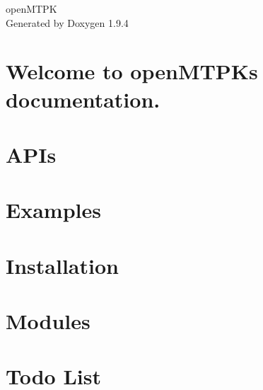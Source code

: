 \documentclass[twoside]{book}
\newcommand{\+}{\discretionary{\mbox{\scriptsize$\hookleftarrow$}}{}{}}
\newcommand{\clearemptydoublepage}{%
    \newpage{\pagestyle{empty}\cleardoublepage}%
  }
\begin{document}
  \raggedbottom
    \hypersetup{pageanchor=false,
                bookmarksnumbered=true,
                pdfencoding=unicode
               }
  \begin{titlepage}
  \vspace*{7cm}
  \begin{center}%
  {\Large open\+MTPK}\\
  \vspace*{1cm}
  {\large Generated by Doxygen 1.9.4}\\
  \end{center}
  \end{titlepage}
  \clearemptydoublepage
  \tableofcontents
  \clearemptydoublepage
  \hypersetup{pageanchor=true}
\chapter{Welcome to open\+MTPK\textquotesingle{}s documentation.}
\label{index}\hypertarget{index}{}
\chapter{APIs}
\label{md_docs_source_APIs}

\chapter{Examples}
\label{md_docs_source_Examples}

\chapter{Installation}
\label{md_docs_source_Installation}

\chapter{Modules}
\label{md_docs_source_Modules}

\chapter{Todo List}
\label{todo}

\end{document}

